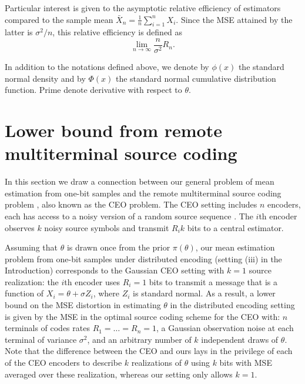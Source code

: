 \documentclass[letterpaper, conference]{IEEEtran}      %
\begin{document}
Particular interest is given to the asymptotic relative efficiency of estimators compared to the sample mean $\bar{X}_n = \frac{1}{n} \sum_{i=1}^n X_i$. Since the MSE attained by the latter is $\sigma^2/n$, this relative efficiency is defined as
\begin{equation}
 \lim_{n \rightarrow \infty} \frac{n}{\sigma^2}  R_n. 
\label{eq:relative_efficiency}
\end{equation}

In addition to the notations defined above, we denote by $\phi(x)$ the standard normal density and by $\Phi(x)$ the standard normal cumulative distribution function. Prime denote derivative with respect to $\theta$.



\section{Lower bound from remote multiterminal source coding \label{sec:ceo}}
In this section we draw a connection between our general problem of mean estimation from one-bit samples and the remote multiterminal source coding problem \cite{berger1996ceo}, also known as the CEO problem. The CEO setting includes $n$ encoders, each has access to a noisy version of a random source sequence \cite{berger1996ceo}. 
The $i$th encoder observes $k$ noisy source symbols and transmit $R_i k$ bits to a central estimator. \par
Assuming that $\theta$ is drawn once from the prior $\pi(\theta)$, our mean estimation problem from one-bit samples under distributed encoding (setting (iii) in the Introduction) corresponds to the Gaussian CEO setting with $k=1$ source realization: the $i$th encoder uses $R_i=1$ bits to transmit a message that is a function of $X_i = \theta + \sigma Z_i$, where $Z_i$ is standard normal. As a result, a lower bound on the MSE distortion in estimating $\theta$ in the distributed encoding setting is given by the MSE in the optimal source coding scheme for the CEO with: $n$ terminals of codes rates $R_1 = \ldots = R_n = 1$, a Gaussian observation noise at each terminal of variance $\sigma^2$, and an arbitrary number of $k$ independent draws of $\theta$. Note that the difference between the CEO and ours lays in the privilege of each of the CEO encoders to describe $k$ realizations of $\theta$ using $k$ bits with MSE averaged over these realization, whereas our setting only allows $k=1$. 
 \\
\end{document}
